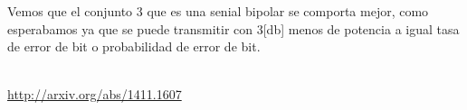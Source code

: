 \documentclass[10pt]{article}
\begin{document}
Vemos que el conjunto 3 que es una senial bipolar se comporta mejor, como esperabamos 
ya que se puede transmitir con 3[db] menos de potencia a igual tasa de error de bit o 
probabilidad de error de bit.

\newpage 



\begin{thebibliography}{6} \\ \url{http://arxiv.org/abs/1411.1607} 
\end{thebibliography} 
\end{document}
